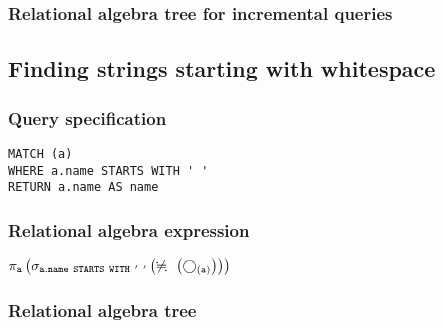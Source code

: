 \subsubsection*{Relational algebra tree for incremental queries}


\subsection{Finding strings starting with whitespace}

\subsubsection*{Query specification}

\begin{lstlisting}
MATCH (a)
WHERE a.name STARTS WITH ' '
RETURN a.name AS name
\end{lstlisting}

\subsubsection*{Relational algebra expression}

$\projection{\var{a}} \left(\selection{\mathtt{a.name~STARTS~WITH~'~'}} \left(\alldifferent{} \left(\getvertices{a}{}\right)\right)\right)$

\subsubsection*{Relational algebra tree}


